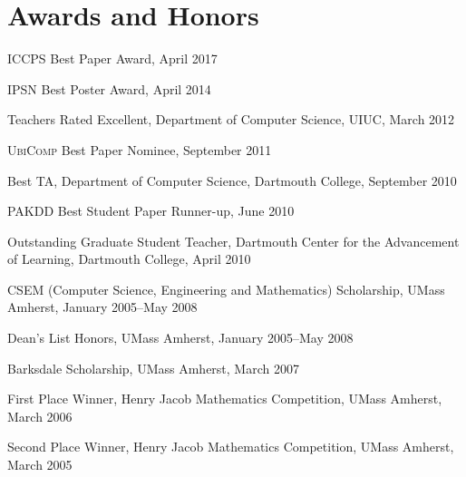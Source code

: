 
\section{\sc Awards and Honors}

\textsc{ICCPS} Best Paper Award, April 2017
\vspace*{-2.5mm}


\textsc{IPSN} Best Poster Award, April 2014
\vspace*{-2.5mm}

Teachers Rated Excellent, Department of Computer Science, UIUC, March 2012
\vspace*{-2.5mm}

\textsc{UbiComp} Best Paper Nominee, September 2011
\vspace*{-2.5mm}

Best TA, Department of Computer Science, Dartmouth College, September 2010
\vspace*{-2.5mm}

\textsc{PAKDD} Best Student Paper Runner-up, June 2010
\vspace*{-2.5mm}

Outstanding Graduate Student Teacher, Dartmouth
Center for the Advancement of Learning, Dartmouth College, April 2010
\vspace*{-2.5mm}

CSEM (Computer Science, Engineering and Mathematics) Scholarship,
UMass Amherst, January 2005--May 2008
\vspace*{-2.5mm}

Dean's List Honors, UMass Amherst, January 2005--May 2008
\vspace*{-2.5mm}

Barksdale Scholarship, UMass Amherst, March 2007
\vspace*{-2.5mm}

First Place Winner, Henry Jacob Mathematics
Competition, UMass Amherst, March 2006
\vspace*{-2.5mm}

Second Place Winner, Henry Jacob Mathematics
Competition, UMass Amherst, March 2005
\vspace*{-2.5mm}
